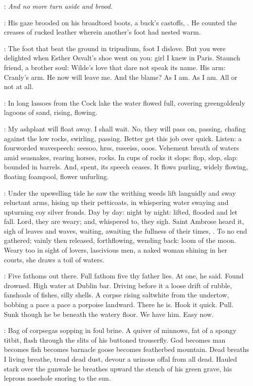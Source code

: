 \StephenInt:
\emph{And no more turn aside and brood.}

:
His gaze brooded on his broadtoed boots, a buck's castoffs, .
He counted the creases of rucked leather wherein another's foot had nested warm.

\StephenInt:
The foot that beat the ground in tripudium,
foot I dislove.
But you were delighted when Esther Osvalt's shoe went on you:
girl I knew in Paris.
Staunch friend, a brother soul:
Wilde's love that dare not speak its name.
His arm:
Cranly's arm.
He now will leave me.
And the blame?
As I am.
As I am.
All or not at all.

:
In long lassoes from the Cock lake
the water flowed full,
covering greengoldenly lagoons of sand,
rising, flowing.

\StephenInt:
My ashplant will float away.
I shall wait.
No, they will pass on, passing,
chafing against the low rocks, swirling, passing.
Better get this job over quick.
Listen:
a fourworded wavespeech:
seesoo, hrss, rsseeiss, ooos.
Vehement breath of waters
amid seasnakes, rearing horses, rocks.
In cups of rocks it slops:
flop, slop, slap:
bounded in barrels.
And, spent, its speech ceases.
It flows purling,
widely flowing,
floating foampool,
flower unfurling.

:
Under the upswelling tide
he saw the writhing weeds lift languidly
and sway reluctant arms,
hising up their petticoats,
in whispering water swaying and upturning coy silver fronds.
Day by day:
night by night:
lifted, flooded and let fall.
Lord, they are weary;
and, whispered to, they sigh.
Saint Ambrose heard it,
sigh of leaves and waves,
waiting, awaiting the fullness of their times,
.
To no end gathered;
vainly then released, forthflowing,
wending back:
loom of the moon.
Weary too in sight of lovers,
lascivious men,
a naked woman shining in her courts,
she draws a toil of waters.

\StephenInt:
Five fathoms out there.
Full fathom five thy father lies.
At one, he said.
Found drowned.
High water at Dublin bar.
Driving before it a loose drift of rubble,
fanshoals of fishes, silly shells.
A corpse rising saltwhite from the undertow,
bobbing a pace a pace a porpoise landward.
There he is.
Hook it quick.
Pull.
Sunk though he be beneath the watery floor.
We have him.
Easy now.

\StephenInt:
Bag of corpsegas sopping in foul brine.
A quiver of minnows,
fat of a spongy titbit,
flash through the slits of his buttoned trouserfly.
God becomes man
becomes fish
becomes barnacle goose
becomes featherbed mountain.
Dead breaths I living breathe,
tread dead dust,
devour a urinous offal from all dead.
Hauled stark over the gunwale
he breathes upward the stench of his green grave,
his leprous nosehole snoring to the sun.

